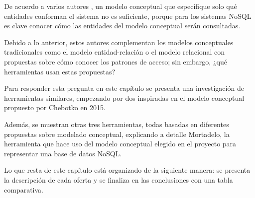 De acuerdo a varios autores \cite{chebotko_big_2015,de_lima_workload-driven_2015,mior_nose_2017-1}, un modelo conceptual que especifique solo qué entidades conforman el sistema no es suficiente, porque para los sistemas NoSQL es clave conocer cómo las entidades del modelo conceptual serán consultadas.


Debido a lo anterior, estos autores complementan los modelos conceptuales tradicionales como el modelo entidad-relación o el modelo relacional con propuestas sobre cómo conocer los patrones de acceso; sin embargo, ¿qué herramientas usan estas propuestas?


Para responder esta pregunta en este capítulo se presenta una investigación de herramientas similares, empezando por dos inspiradas en el modelo conceptual propuesto por Chebotko en 2015.


Además, se muestran otras tres herramientas, todas basadas en diferentes propuestas sobre modelado conceptual, explicando a detalle Mortadelo, la herramienta que hace uso del modelo conceptual elegido en el proyecto para representar una base de datos NoSQL.


Lo que resta de este capítulo está organizado de la siguiente manera: se presenta la descripción de cada oferta y se finaliza en las conclusiones con una tabla comparativa.








